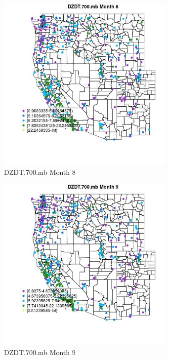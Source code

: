 \begin{figure} 
\centering  
\includegraphics[width=0.77\textwidth]{Code_Outputs/ML_input_report_ML_input_PM25_Step5_part_d_de_duplicated_aves_ML_input_MapObsMo8DZDT700mb.jpg} 
\caption{\label{fig:ML_input_report_ML_input_PM25_Step5_part_d_de_duplicated_aves_ML_inputMapObsMo8DZDT700mb}DZDT.700.mb Month 8} 
\end{figure} 
 

\begin{figure} 
\centering  
\includegraphics[width=0.77\textwidth]{Code_Outputs/ML_input_report_ML_input_PM25_Step5_part_d_de_duplicated_aves_ML_input_MapObsMo9DZDT700mb.jpg} 
\caption{\label{fig:ML_input_report_ML_input_PM25_Step5_part_d_de_duplicated_aves_ML_inputMapObsMo9DZDT700mb}DZDT.700.mb Month 9} 
\end{figure} 
 

